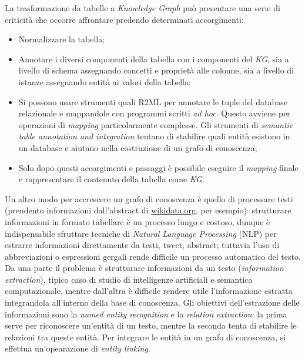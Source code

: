 \documentclass[11pt]{article}
\begin{document}
La trasformazione da tabelle a \textit{Knowledge Graph} può presentare una serie di criticità che occorre affrontare predendo determinati accorgimenti:
\begin{itemize}
\item Normalizzare la tabella;
\item Annotare i diversi componenti della tabella con i componenti del \textit{KG}, sia a livello di schema assegnando concetti e proprietà alle colonne, sia a livello di istanze assegnando entità ai valori della tabella;
\item Si possono usare strumenti quali R2ML per annotare le tuple del database relazionale e mappandole con programmi scritti \textit{ad hoc}. Questo avviene per operazioni di \textit{mapping} particolarmente complesse. Gli strumenti di \textit{semantic table annotation and integration} tentano di stabilire quali entità esistono in un database e aiutano nella costruzione di un grafo di conoscenza;
\item Solo dopo questi accorgimenti e passaggi è possibile eseguire il \textit{mapping} finale e rappresentare il contenuto della tabella come \textit{KG}.
\end{itemize}
Un altro modo per accrescere un grafo di conoscenza è quello di processare testi (prendento informazioni dall'abstract di \url{wikidata.org}, per esempio): strutturare informazioni in formato tabellare è un processo lungo e costoso, dunque è indispensabile sfruttare tecniche di \textit{Natural Language Processing} (NLP) per estrarre informazioni direttamente da testi, tweet, abstract; tuttavia l'uso di abbreviazioni o espressioni gergali rende difficile un processo automatico del testo.
Da una parte il problema è strutturare informazioni da un testo (\textit{information extraction}), tipico caso di studio di intelligenze artificiali e semantica computazionale, mentre dall'altra è difficile rendere utile l'informazione estratta integrandola all'interno della base di conoscenza.
Gli obiettivi dell'estrazione delle informazioni sono la \textit{named entity recognition} e la \textit{relation extraction}: la prima serve per riconoscere un'entità di un testo, mentre la seconda tenta di stabilire le relazioni tra queste entità.
Per integrare le entità in un grafo di conoscenza, si effettua un'opearazione di \textit{entity linking}.
\end{document}
